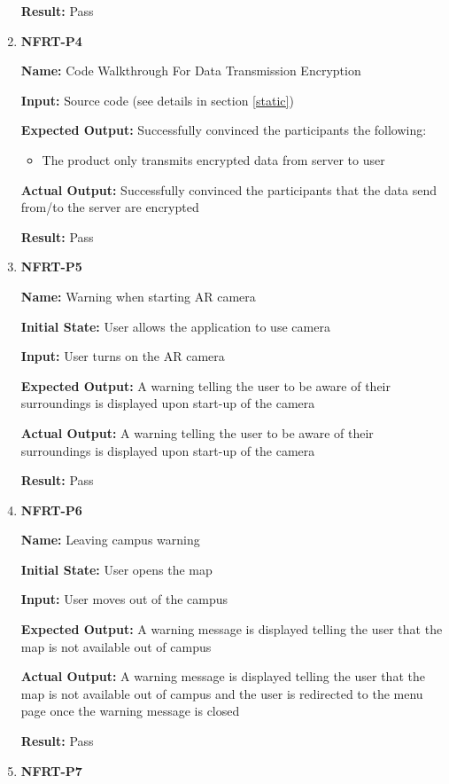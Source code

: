 \documentclass[12pt, titlepage]{article}
\begin{document}
\begin{enumerate}
\textbf{Result:} Pass

\item \textbf{NFRT-P4}

\textbf{Name:} Code Walkthrough For Data Transmission Encryption

\textbf{Input:} Source code (see details in section \ref{static})

\textbf{Expected Output:} Successfully convinced the participants the following:
\begin{itemize}
  \item The product only transmits encrypted data from server to user
\end{itemize}

\textbf{Actual Output:} Successfully convinced the participants that the data send from/to the server are encrypted

\textbf{Result:} Pass

\item \textbf{NFRT-P5}

\textbf{Name:} Warning when starting AR camera

\textbf{Initial State:} User allows the application to use camera
					
\textbf{Input:} User turns on the AR camera
					
\textbf{Expected Output:} A warning telling the user to be aware of their surroundings is displayed upon start-up of the camera

\textbf{Actual Output:} A warning telling the user to be aware of their surroundings is displayed upon start-up of the camera

\textbf{Result:} Pass

\item \textbf{NFRT-P6}

\textbf{Name:} Leaving campus warning

\textbf{Initial State:} User opens the map
					
\textbf{Input:} User moves out of the campus
					
\textbf{Expected Output:} A warning message is displayed telling the user that the map is not available out of campus

\textbf{Actual Output:} A warning message is displayed telling the user that the map is not available out of campus and the user is redirected to the menu page once the warning message is closed

\textbf{Result:} Pass

\item \textbf{NFRT-P7}


\end{enumerate}
\end{document}
